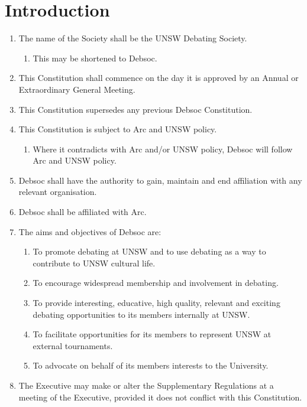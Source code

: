\newpage
\section{Introduction}

\begin{enumerate}
    \item The name of the Society shall be the UNSW Debating Society.
    \begin{enumerate}
        \item This may be shortened to Debsoc.
    \end{enumerate}
    \item This Constitution shall commence on the day it is approved by an Annual or Extraordinary General Meeting.
    \item This Constitution supersedes any previous Debsoc Constitution.
    \item This Constitution is subject to Arc and UNSW policy.
    \begin{enumerate}
        \item Where it contradicts with Arc and/or UNSW policy, Debsoc will follow Arc and UNSW policy.
    \end{enumerate}
    \item Debsoc shall have the authority to gain, maintain and end affiliation with any relevant organisation.
    \item Debsoc shall be affiliated with Arc.
    \item The aims and objectives of Debsoc are: \label{debsoc_aims}
    \begin{enumerate}
        \item To promote debating at UNSW and to use debating as a way to contribute to UNSW cultural life.
        \item To encourage widespread membership and involvement in debating.
        \item To provide interesting, educative, high quality, relevant and exciting debating opportunities to its members internally at UNSW.
        \item To facilitate opportunities for its members to represent UNSW at external tournaments.
        \item To advocate on behalf of its members interests to the University.
    \end{enumerate}
    \item The Executive may make or alter the Supplementary Regulations at a meeting of the Executive, provided it does not conflict with this Constitution.

\end{enumerate}
